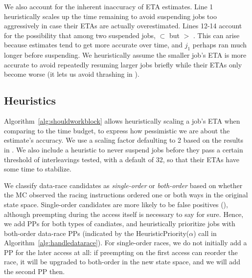 %
We also account for the inherent inaccuracy of ETA estimates.
Line 1 heuristically scales up the time remaining to avoid suspending jobs too aggressively
in case their ETAs are actually overestimated.
Lines 12-14 account for the
possibility that among two suspended jobs,
 $\subset$ 
but
 $>$ .
This can arise because estimates tend to get more accurate over time,
and $j_1$ perhaps ran much longer before suspending.
We heuristically assume the smaller job's ETA is more accurate
to avoid repeatedly resuming larger jobs briefly while their ETAs only become worse
(it lets us avoid thrashing in \quicksand).


\subsection{Heuristics}
Algorithm~\ref{alg:shouldworkblock} allows heuristically scaling a job's ETA when comparing to the time budget,
to express how pessimistic we are about the estimate's accuracy.
We use a scaling factor defaulting to 2 based on the results in \cite{estimation}.
We also include a heuristic to
never suspend jobs before they pass a certain threshold of interleavings tested,
with a default of 32,
so that their ETAs have some time to stabilize.

We classify data-race candidates as {\em single-order} or {\em both-order} \cite{portend}
based on whether the MC observed the racing instructions ordered one or both ways in the original state space.
Single-order candidates are more likely to be false positives (\sect{\ref{sec:overview-dr}}),
although preempting during the access itself is necessary to say for sure.
Hence, we add PPs for both types of candiates, and heuristically prioritize jobs with both-order data-race PPs
(indicated by the HeuristicPriority($\alpha$) call in Algorithm~\ref{alg:handledatarace}).
For single-order races, we do not initially add a PP for the later access at all:
if preempting on the first access can reorder the race, it will be upgraded to both-order in the new state space, and we will add the second PP then.
